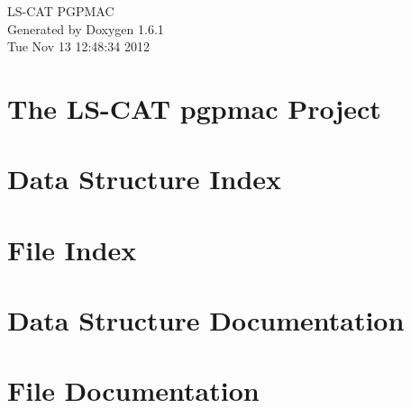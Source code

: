 \documentclass[a4paper]{book}
\begin{document}
\hypersetup{pageanchor=false}
\begin{titlepage}
\vspace*{7cm}
\begin{center}
{\Large LS-\/CAT PGPMAC }\\
\vspace*{1cm}
{\large Generated by Doxygen 1.6.1}\\
\vspace*{0.5cm}
{\small Tue Nov 13 12:48:34 2012}\\
\end{center}
\end{titlepage}
\clearemptydoublepage
{}
\tableofcontents
\clearemptydoublepage
{}
\hypersetup{pageanchor=true}
\chapter{The LS-\/CAT pgpmac Project}
\label{index}\hypertarget{index}{}
\chapter{Data Structure Index}

\chapter{File Index}

\chapter{Data Structure Documentation}















\chapter{File Documentation}










\printindex
\end{document}

